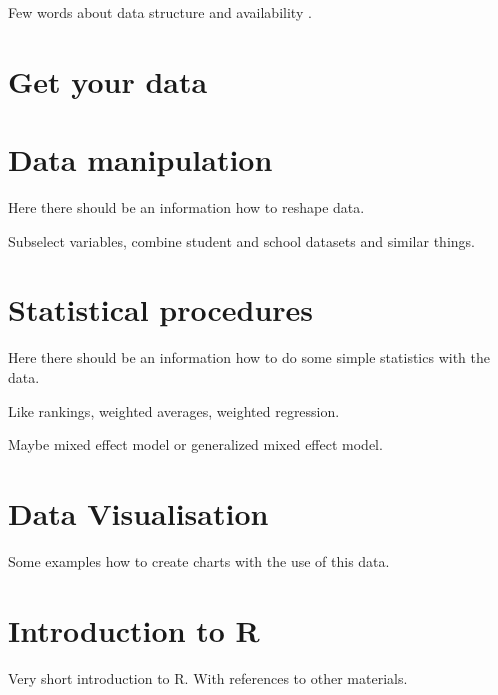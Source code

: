 \documentclass{tufte-book}
\begin{document}
Few words about data structure and availability \cite{PISAwebsite}.

\chapter{Get your data}


\chapter{Data manipulation}
Here there should be an information how to reshape data.

Subselect variables, combine student and school datasets and similar things.

\chapter{Statistical procedures}


Here there should be an information how to do some simple statistics with the data.

Like rankings, weighted averages, weighted regression.

Maybe mixed effect model or generalized mixed effect model.

\chapter{Data Visualisation}

Some examples how to create charts with the use of this data. 

\backmatter

\chapter{Introduction to R}
\label{sec:introToR}
Very short introduction to R. With references to other materials.




\printindex
\end{document}
